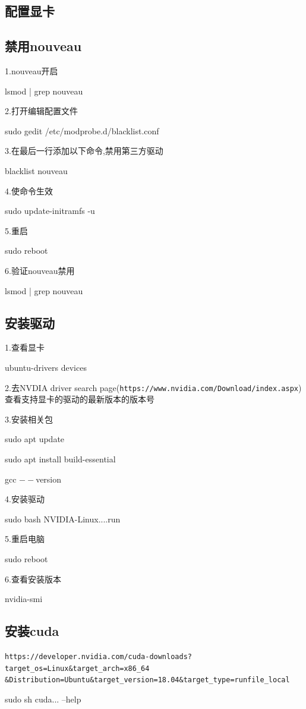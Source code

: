 \documentclass[11pt]{article}
\begin{document}
\begin{CJK}{UTF8}{gkai}
\section{配置显卡}
\subsection{禁用nouveau}
1.nouveau开启

lsmod | grep nouveau

2.打开编辑配置文件

sudo gedit /etc/modprobe.d/blacklist.conf

3.在最后一行添加以下命令,禁用第三方驱动

blacklist nouveau

4.使命令生效

sudo update-initramfs -u

5.重启

sudo reboot

6.验证nouveau禁用

lsmod | grep nouveau

\subsection{安装驱动}  
1.查看显卡

ubuntu-drivers devices

2.去NVDIA driver search page(\texttt{https://www.nvidia.com/Download/index.aspx})查看支持显卡的驱动的最新版本的版本号

3.安装相关包

sudo apt update

sudo apt install build-essential

gcc $--$version

4.安装驱动

sudo bash NVIDIA-Linux....run

5.重启电脑

sudo reboot

6.查看安装版本

nvidia-smi

\subsection{安装cuda}

\texttt{https://developer.nvidia.com/cuda-downloads?target\_os=Linux\&target\_arch=x86\_64
	\&Distribution=Ubuntu\&target\_version=18.04\&target\_type=runfile\_local}

sudo sh cuda... --help


\end{CJK}
\end{document}
